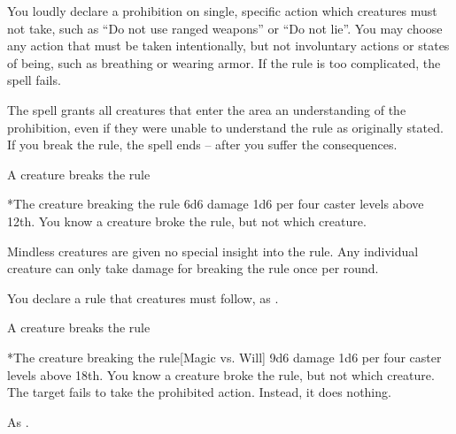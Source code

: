 \begin{spellheader}
    \spelldur{\durshort}
\end{spellheader}
\begin{spelleffects}
    \spellline
    \spelleffect You loudly declare a prohibition on single, specific action which creatures must not take, such as ``Do not use ranged weapons'' or ``Do not lie''. You may choose any action that must be taken intentionally, but not involuntary actions or states of being, such as breathing or wearing armor. If the rule is too complicated, the spell fails.

    The spell grants all creatures that enter the area an understanding of the prohibition, even if they were unable to understand the rule as originally stated. If you break the rule, the spell ends -- after you suffer the consequences.
    \begin{spelltrigger}{A creature breaks the rule}
        \begin{spelltarget}*{The creature breaking the rule}
            \spelleffect 6d6 damage \add 1d6 per four caster levels above 12th. You know a creature broke the rule, but not which creature.
        \end{spelltarget}
    \end{spelltrigger}
\end{spelleffects}
\begin{spellfooter}
    \spellnotes Mindless creatures are given no special insight into the rule. Any individual creature can only take damage for breaking the rule once per round.
\end{spellfooter}

\begin{spellheader}
    \spelldur{\durshort}
\end{spellheader}
\begin{spelleffects}
    \spellline
    \spelleffect You declare a rule that creatures must follow, as .
    \begin{spelltrigger}{A creature breaks the rule}
        \begin{spelltarget}*{The creature breaking the rule}[Magic vs. Will]
            \spelleffect 9d6 damage \add 1d6 per four caster levels above 18th. You know a creature broke the rule, but not which creature.
            \spellsuccess The target fails to take the prohibited action. Instead, it does nothing.
        \end{spelltarget}
    \end{spelltrigger}
\end{spelleffects}
\begin{spellfooter}
    \spellnotes As .
\end{spellfooter}

